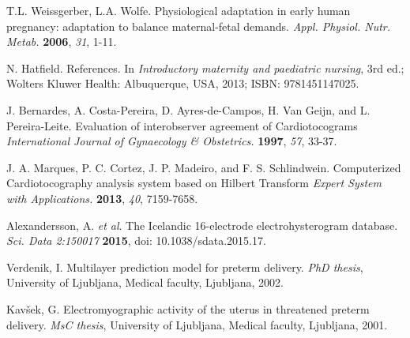 \documentclass[bioengineering,article,submit,moreauthors,pdftex,10pt,a4paper]{mdpi}
\begin{document}
\begin{thebibliography}{999}
	
T.L. Weissgerber, L.A. Wolfe. Physiological adaptation in early human pregnancy: adaptation to balance maternal-fetal demands. {\em Appl. Physiol. Nutr. Metab.} {\bf 2006}, {\em 31}, 1-11.

N. Hatfield. References. In {\em Introductory maternity and paediatric nursing}, 3rd ed.; Wolters Kluwer Health: Albuquerque, USA,  2013; ISBN: 9781451147025.		

J. Bernardes, A. Costa-Pereira, D. Ayres-de-Campos, H. Van Geijn, and L. Pereira-Leite. Evaluation of interobserver agreement of Cardiotocograms {\em International Journal of Gynaecology \& Obstetrics.} {\bf 1997}, {\em 57}, 33-37.

J. A. Marques, P. C. Cortez, J. P. Madeiro, and F. S. Schlindwein. Computerized Cardiotocography analysis system based on Hilbert Transform {\em Expert System with Applications.} {\bf 2013}, {\em 40}, 7159-7658.		
	
Alexandersson, A. { \em et al}.  The Icelandic 16-electrode electrohysterogram database. {\em Sci. Data 2:150017} {\bf 2015}, doi: 10.1038/sdata.2015.17.

Verdenik, I.  Multilayer prediction model for preterm delivery. {\em PhD thesis}, University of Ljubljana, Medical faculty, Ljubljana, 2002.

Kavšek, G.  Electromyographic activity of the uterus in threatened preterm delivery. {\em MsC thesis}, University of Ljubljana, Medical faculty, Ljubljana, 2001.


	





\end{thebibliography}
\end{document}
